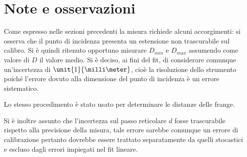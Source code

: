 \section{Note e osservazioni}
Come espresso nelle sezioni precedenti la misura richiede alcuni accorgimenti:
si osserva che il punto di incidenza 
presenta un estensione non trascurabile sul calibro.
Si è quindi ritenuto opportuno misurare $D_{min}$ e $ D_{max}$
assumendo come valore di $D$ il valore medio. Si è deciso, ai fini del fit, di considerare comunque un'incertezza di $\unit{1}{\milli\meter}$, cioè la risoluzione dello strumento poiché l'errore dovuto alla dimensione del punto di incidenza è un errore sistematico.

Lo stesso procedimento è stato usato per determinare le distanze delle frange.

Si è inoltre assunto che l'incertezza sul passo
reticolare $d$ fosse trascurabile rispetto alla precisione della misura, tale errore sarebbe comunque un errore di calibrazione pertanto dovrebbe essere trattato separatamente da quelli stocastici e 
escluso dagli errori impiegati nel fit lineare.